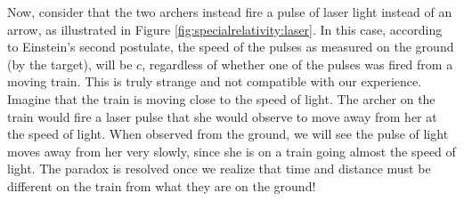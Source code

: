Now, consider that the two archers instead fire a pulse of laser light instead of an arrow, as illustrated in Figure \ref{fig:specialrelativity:laser}. 
In this case, according to Einstein's second postulate, the speed of the pulses as measured on the ground (by the target), will be $c$, regardless of whether one of the pulses was fired from a moving train. This is truly strange and not compatible with our experience. Imagine that the train is moving close to the speed of light. The archer on the train would fire a laser pulse that she would observe to move away from her at the speed of light. When observed from the ground, we will see the pulse of light moves away from her very slowly, since she is on a train going almost the speed of light. The paradox is resolved once we realize that time and distance must be different on the train from what they are on the ground!

